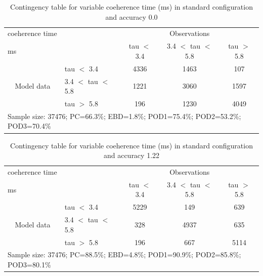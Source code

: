 \documentclass[a4paper,english]{article}
\begin{document}
\newpage

\clearpage
\begin{table}[]
\begin{center}
\begin{tabular}{llccc}
\hline
{coeherence time}                                       &                                                    & \multicolumn{3}{c}{Observations}                 \\
{ms}                                       &                             & tau $<$ 3.4   & 3.4 $<$ tau $<$ 5.8 & tau $>$ 5.8 \\
\hline
\multicolumn{1}{c}{\multirow{3}{*}{Model data}}  & tau $<$ 3.4             & 4336                & 1463                       & 107              \\
                                                 & 3.4  $<$ tau $<$ 5.8 & 1221                & 3060                       & 1597              \\
                                                 & tau $>$ 5.8             & 196                & 1230                       & 4049              \\
\hline
\multicolumn{5}{l}{Sample size: 37476; PC=66.3\%; EBD=1.8\%; POD1=75.4\%; POD2=53.2\%; POD3=70.4\%}
\end{tabular}
\end{center}
\caption{Contingency table for variable coeherence time (ms) in standard configuration and accuracy 0.0}
\label{tab:contingencytauBEF}
\end{table}
\begin{table}[]
\begin{center}
\begin{tabular}{llccc}
\hline
{coeherence time}                                       &                                                    & \multicolumn{3}{c}{Observations}                 \\
{ms}                                       &                             & tau $<$ 3.4   & 3.4 $<$ tau $<$ 5.8 & tau $>$ 5.8 \\
\hline
\multicolumn{1}{c}{\multirow{3}{*}{Model data}}  & tau $<$ 3.4             & 5229                & 149                       & 639              \\
                                                 & 3.4  $<$ tau $<$ 5.8 & 328                & 4937                       & 635              \\
                                                 & tau $>$ 5.8             & 196                & 667                       & 5114              \\
\hline
\multicolumn{5}{l}{Sample size: 37476; PC=88.5\%; EBD=4.8\%; POD1=90.9\%; POD2=85.8\%; POD3=80.1\%}
\end{tabular}
\end{center}
\caption{Contingency table for variable coeherence time (ms) in standard configuration and accuracy 1.22}
\label{tab:contingencytauBEF}
\end{table}
\end{document}
